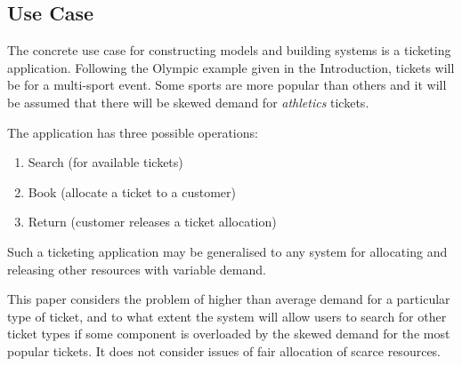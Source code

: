 \documentclass[runningheads]{llncs}
\begin{document}
\subsection{Use Case}

The concrete use case for constructing models and building systems is a ticketing application.  Following the Olympic example given in the Introduction, tickets will be for a multi-sport event.  Some sports are more popular than others and it will be assumed that there will be skewed demand for {\itshape athletics} tickets.

The application has three possible operations:
\begin{enumerate}
\item Search (for available tickets)
\item Book (allocate a ticket to a customer)
\item Return (customer releases a ticket allocation)
\end{enumerate}

Such a ticketing application may be generalised to any system for allocating and releasing other resources with variable demand.

This paper considers the problem of higher than average demand for a particular type of ticket, and to what extent the system will allow users to search for other ticket types if some component is overloaded by the skewed demand for the most popular tickets.  It does not consider issues of fair allocation of scarce resources.

%
%



%
%



%
%



%
%



%
%



%
%



%
%



%
%



\end{document}
